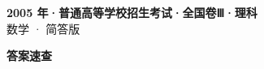 \documentclass[zihao=-4, a4paper]{ctexart}
\begin{document}
\begin{center}
  {\Large\bfseries 2005 年·普通高等学校招生考试·全国卷Ⅲ·理科}\\[4pt]
  {\large 数学 · 简答版}
\end{center}
\medskip
{}

\clearpage
{}
\begin{center}{\Large\bfseries 答案速查}\end{center}
\medskip

\end{document}
